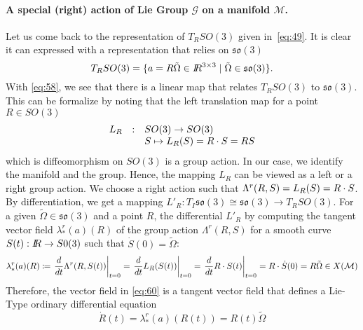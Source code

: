 \paragraph{ A special  (right)  action of Lie Group $\mathcal G$ on a manifold $\mathcal M$. } 

Let us come back to the representation of  $T_RSO(3)$ given in~\eqref{eq:49}. It is clear it can expressed with a representation that relies on $\mathfrak{so}(3)$
\begin{equation}
  \label{eq:58}
   T_RSO(3) = \{ a = R \tilde \Omega \in \mbox{\rm $I\!\!R$}^{3\times 3} \mid \tilde \Omega \in \mathfrak{so}(3) \}.
\end{equation}
With \eqref{eq:58}, we see that there is a linear map that relates $T_RSO(3)$ to  $\mathfrak{so}(3)$. This can be formalize by noting that the left translation map for a point $R \in SO(3)$ 
\begin{equation}
  \label{eq:59}
  \begin{array}[lcl]{rcl}
    L_R& :&   SO(3)  \rightarrow  SO(3)\\
       & &  S  \mapsto L_R(S) = R \glaw S = RS\\
  \end{array}
\end{equation}
which is diffeomorphism on $SO(3)$ is a group action. In our case, we identify the manifold and the group. Hence, the mapping $L_R$ can be viewed as a left or a right group action. We choose a right action such that $\Lambda^r(R,S) = L_{R}(S) =  R \cdot S $. By differentiation, we get a mapping $L'_R: T_I\mathfrak{so(3)} \cong \mathfrak{so(3)} \rightarrow T_R SO(3)$. For a given $\tilde\Omega \in \mathfrak{so(3)}$ and a point $R$, the differential $L'_R$ by computing the tangent vector field $\lambda^r_{*}(a)(R)$ of the group action  $\Lambda^r(R,S)$ for a smooth curve $S(t) : \mbox{\rm $I\!\!R$} \rightarrow S0(3)$ such that $\dot S(0) = \tilde\Omega$:
\begin{equation}
  \label{eq:60}
   \lambda^r_{*}(a)(R) \coloneqq  \left. \frac{d}{dt} \Lambda^r(R,S(t)) \right|_{t=0} = \left. \frac{d}{dt} L_{R}(S(t)) \right|_{t=0} =  \left. \frac{d}{dt} R \cdot S(t) \right|_{t=0} =  R \cdot \dot S(0) = R \tilde\Omega \in X(\mathcal M)
 \end{equation}
%
Therefore, the vector field in \eqref{eq:60} is a tangent vector field that defines a Lie-Type ordinary differential equation
\begin{equation}
  \label{eq:61}
  \dot R(t) = \lambda^r_{*}(a)(R(t)) = R(t)  \tilde \Omega
\end{equation}


